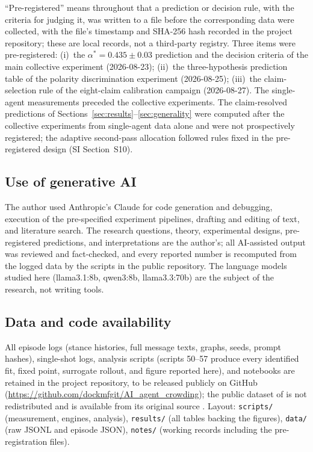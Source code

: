 \documentclass[9pt,twocolumn]{extarticle}
\newcommand{\astar}{\alpha^{*}}
\begin{document}
``Pre-registered'' means throughout that a prediction or decision rule, with
the criteria for judging it, was written to a file before the corresponding
data were collected, with the file's timestamp and SHA-256 hash recorded in
the project repository; these are local records, not a third-party registry.
Three items were pre-registered: (i)~the $\astar = 0.435 \pm 0.03$ prediction
and the decision criteria of the main collective experiment (2026-08-23);
(ii)~the three-hypothesis prediction table of the polarity discrimination
experiment (2026-08-25); (iii)~the claim-selection rule of the eight-claim
calibration campaign (2026-08-27). The single-agent measurements preceded
the collective experiments. The claim-resolved predictions of
Sections~\ref{sec:results}--\ref{sec:generality} were computed after the
collective experiments from single-agent data alone and were not
prospectively registered; the adaptive second-pass allocation followed rules
fixed in the pre-registered design (SI Section~S10).

\subsection*{Use of generative AI}

The author used Anthropic's Claude for code generation and debugging,
execution of the pre-specified experiment pipelines, drafting and editing of
text, and literature search. The research questions, theory, experimental
designs, pre-registered predictions, and interpretations are the author's;
all AI-assisted output was reviewed and fact-checked, and every reported
number is recomputed from the logged data by the scripts in the public
repository. The language models studied here (llama3.1:8b, qwen3:8b,
llama3.3:70b) are the subject of the research, not writing tools.

\subsection*{Data and code availability}

All episode logs (stance histories, full message texts, graphs, seeds, prompt
hashes), single-shot logs, analysis scripts (scripts 50--57 produce every
identified fit, fixed point, surrogate rollout, and figure reported here), and
notebooks are retained in the project repository, to be released publicly on GitHub
(\url{https://github.com/dockmfgit/AI_agent_crowding}); the public
dataset of \citet{El2026} is not redistributed and is available from its
original source \citep{El2026data}. Layout: \texttt{scripts/} (measurement, engines, analysis),
\texttt{results/} (all tables backing the figures), \texttt{data/}
(raw JSONL and episode JSON), \texttt{notes/} (working records including the
pre-registration files).



\end{document}

